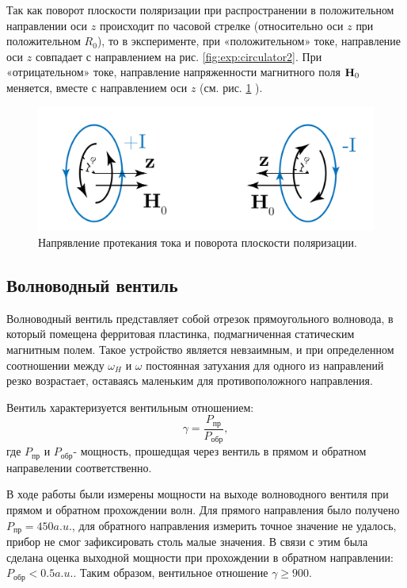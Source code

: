Так как поворот плоскости поляризации при распространении в положительном направлении оси $z$ происходит по часовой
стрелке (относительно оси $z$ при положительном $R_0$), то в эксперименте, при «положительном» токе, направление оси $z$ совпадает с
направлением на рис. \ref{fig:exp:circulator2}. При «отрицательном» токе, направление напряженности магнитного поля
$\textbf{H}_0$ меняется, вместе с направлением оси $z$ (см. рис. \ref{fig:exp:circulator3} ).
\begin{figure}[h!]
    \centering
    \includegraphics[width = 0.7\linewidth]{imgs/circulator3.pdf}
    \caption{Напрявление протекания тока и поворота плоскости поляризации.}
    \label{fig:exp:circulator3}
\end{figure}
\subsection{Волноводный вентиль}
Волноводный вентиль представляет собой отрезок прямоугольного волновода, в который помещена ферритовая пластинка,
подмагниченная статическим магнитным полем. Такое устройство является невзаимным, и при определенном соотношении между
$\omega_{H}$ и $\omega$ постоянная затухания для одного из направлений резко возрастает, оставаясь маленьким для
противоположного направления.

Вентиль характеризуется вентильным отношением:
\begin{equation}
    \gamma = \frac{P_{\text{пр}}}{P_{\text{обр}}},
    \label{eq:3:1}
\end{equation}
где $P_{\text{пр}}$ и $P_{\text{обр}}$- мощность, прошедщая через вентиль в прямом и обратном направелении
соответственно.

В ходе работы были измерены мощности на выходе волноводного вентиля при прямом и обратном прохождении волн. Для прямого
направления было получено $P_{\text{пр}} = 450 a.u.$, для обратного направления измерить точное значение не удалось,
прибор не смог зафиксировать столь малые значения. В связи с этим была сделана оценка выходной мощности при прохождении
в обратном направлении: $P_{\text{обр}}<0.5 a.u.$. Таким образом, вентильное отношение $\gamma \geq 900$. 

